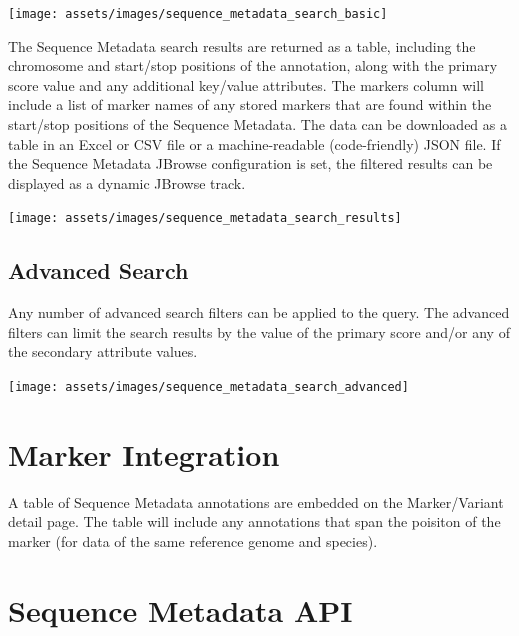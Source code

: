 \documentclass[
  12pt,
]{book}
\begin{document}
\begin{center}\texttt{[image: assets/images/sequence\_metadata\_search\_basic]} \end{center}

The Sequence Metadata search results are returned as a table, including the chromosome and start/stop positions of the annotation, along with the primary score value and any additional key/value attributes. The markers column will include a list of marker names of any stored markers that are found within the start/stop positions of the Sequence Metadata. The data can be downloaded as a table in an Excel or CSV file or a machine-readable (code-friendly) JSON file. If the Sequence Metadata JBrowse configuration is set, the filtered results can be displayed as a dynamic JBrowse track.

\begin{center}\texttt{[image: assets/images/sequence\_metadata\_search\_results]} \end{center}

\hypertarget{advanced-search}{%
\subsection{Advanced Search}\label{advanced-search}}

Any number of advanced search filters can be applied to the query. The advanced filters can limit the search results by the value of the primary score and/or any of the secondary attribute values.

\begin{center}\texttt{[image: assets/images/sequence\_metadata\_search\_advanced]} \end{center}

\hypertarget{marker-integration}{%
\section{Marker Integration}\label{marker-integration}}

A table of Sequence Metadata annotations are embedded on the Marker/Variant detail page. The table will include any annotations that span the poisiton of the marker (for data of the same reference genome and species).

\hypertarget{sequence-metadata-api}{%
\section{Sequence Metadata API}\label{sequence-metadata-api}}
\end{document}
